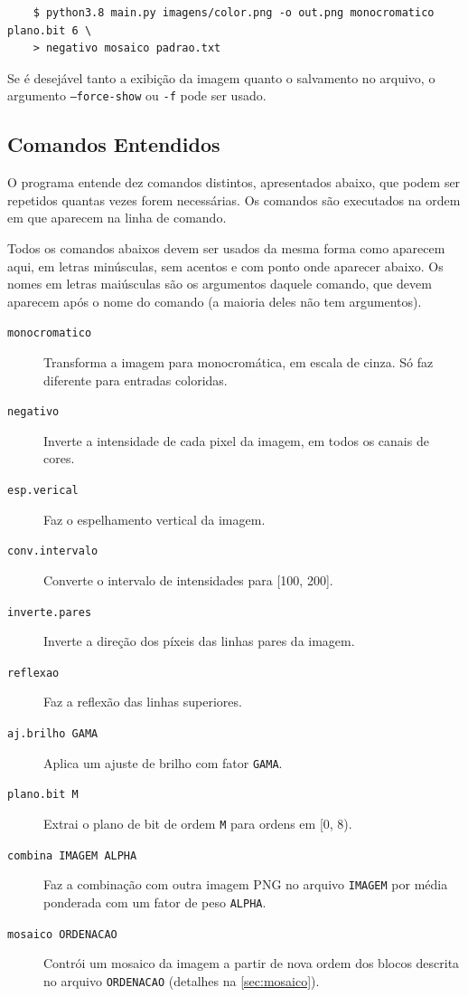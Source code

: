 \begin{verbatim}
    $ python3.8 main.py imagens/color.png -o out.png monocromatico plano.bit 6 \
    > negativo mosaico padrao.txt
\end{verbatim}

Se é desejável tanto a exibição da imagem quanto o salvamento no arquivo, o argumento \texttt{--force-show} ou \texttt{-f} pode ser usado.

\subsection{Comandos Entendidos}

O programa entende dez comandos distintos, apresentados abaixo, que podem ser repetidos quantas vezes forem necessárias. Os comandos são executados na ordem em que aparecem na linha de comando.

Todos os comandos abaixos devem ser usados da mesma forma como aparecem aqui, em letras minúsculas, sem acentos e com ponto onde aparecer abaixo. Os nomes em letras maiúsculas são os argumentos daquele comando, que devem aparecem após o nome do comando (a maioria deles não tem argumentos).

\begin{description}
    \item[\texttt{monocromatico}] Transforma a imagem para monocromática, em escala de cinza. Só faz diferente para entradas coloridas.

    \item[\texttt{negativo}] Inverte a intensidade de cada pixel da imagem, em todos os canais de cores.

    \item[\texttt{esp.verical}] Faz o espelhamento vertical da imagem.

    \item[\texttt{conv.intervalo}] Converte o intervalo de intensidades para [100, 200].

    \item[\texttt{inverte.pares}] Inverte a direção dos píxeis das linhas pares da imagem.

    \item[\texttt{reflexao}] Faz a reflexão das linhas superiores.

    \item[\texttt{aj.brilho GAMA}] Aplica um ajuste de brilho com fator \texttt{GAMA}.

    \item[\texttt{plano.bit M}] Extrai o plano de bit de ordem \texttt{M} para ordens em [0, 8).

    \item[\texttt{combina IMAGEM ALPHA}] Faz a combinação com outra imagem PNG no arquivo \texttt{IMAGEM} por média ponderada com um fator de peso \texttt{ALPHA}.

    \item[\texttt{mosaico ORDENACAO}] Contrói um mosaico da imagem a partir de nova ordem dos blocos descrita no arquivo \texttt{ORDENACAO} (detalhes na \cref{sec:mosaico}).
\end{description}
